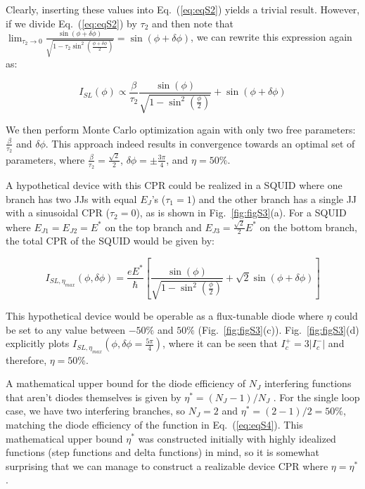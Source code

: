 \documentclass[%
 reprint,
 amsmath,amssymb,
 aps,
]{revtex4-2}
\begin{document}
Clearly, inserting these values into Eq.~(\ref{eq:eqS2}) yields a trivial result. However, if we divide Eq.~(\ref{eq:eqS2}) by $\tau_2$ and then note that $\lim_{\tau_2\rightarrow0}\frac{\sin(\phi+\delta\phi)}{\sqrt{1-\tau_2 \sin^2(\frac{\phi+\delta\phi}{2})}}=\sin(\phi+\delta\phi)$, we can rewrite this expression again as: 

\begin{equation}
    \label{eq:eqS3}
    I_{SL}(\phi) \propto \frac{\beta}{\tau_2}\frac{\sin(\phi)}{\sqrt{1- \sin^2(\frac{\phi}{2})}}+\sin(\phi+\delta\phi)
\end{equation}

We then perform Monte Carlo optimization again with only two free parameters: $\frac{\beta}{\tau_2}$ and $\delta\phi$. This approach indeed results in convergence towards an optimal set of parameters, where $\frac{\beta}{\tau_2}=\frac{\sqrt{2}}{2} $, $ \delta\phi=\pm\frac{3\pi}{4}$, and $\eta=50\%$.

A hypothetical device with this CPR could be realized in a SQUID where one branch has two JJs with equal $E_J$'s ($\tau_1=1$) and the other branch has a single JJ with a sinusoidal CPR ($\tau_2=0$), as is shown in Fig.~\ref{fig:figS3}(a). For a SQUID where $E_{J1}=E_{J2}=E^*$ on the top branch and $E_{J3}=\frac{\sqrt{2}}{2}E^*$ on the bottom branch, the total CPR of the SQUID would be given by: 

\begin{equation}
    \label{eq:eqS4}
    I_{SL,\eta_{max}}(\phi,\delta\phi) = \frac{eE^*}{\hbar}\left[\frac{\sin(\phi)}{\sqrt{1-\sin^2(\frac{\phi}{2})}} + \sqrt{2}\sin(\phi + \delta \phi)\right]
\end{equation}

This hypothetical device would be operable as a flux-tunable diode where $\eta$ could be set to any value between $-50\%$ and $50\%$ (Fig.~\ref{fig:figS3}(c)). Fig.~\ref{fig:figS3}(d) explicitly plots $I_{SL,\eta_{max}}(\phi,\delta\phi=\frac{5\pi}{4})$, where it can be seen that $I_c^+=3|I_c^-|$ and therefore, $\eta=50\%$.

A mathematical upper bound for the diode efficiency of $N_J$ interfering functions that aren't diodes themselves is given by $\eta^*=(N_J-1)/N_J$ \cite{Souto2022}. For the single loop case, we have two interfering branches, so $N_J=2$ and $\eta^*=(2-1)/2=50\%$, matching the diode efficiency of the function in Eq.~(\ref{eq:eqS4}). This mathematical upper bound $\eta^*$ was constructed initially with highly idealized functions (step functions and delta functions) in mind, so it is somewhat surprising that we can manage to construct a realizable device CPR where $\eta=\eta^*$.
\end{document}
